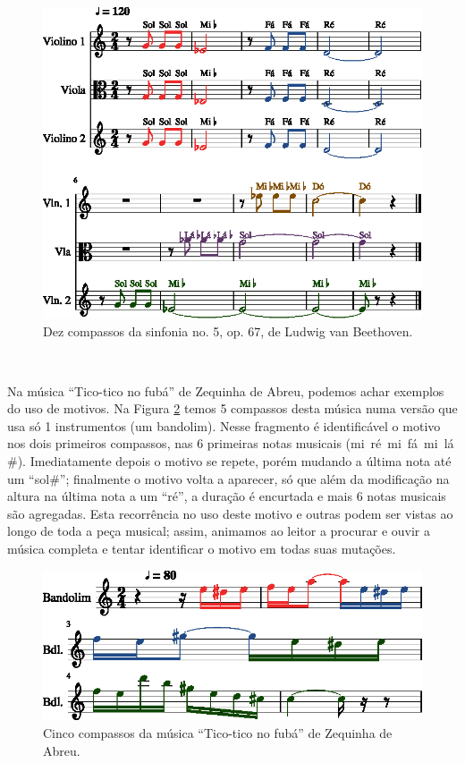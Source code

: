 \begin{figure}[!h]
  \centering
    \includegraphics[width=\workboxsize]{chapters/cap-musica-composer/Symphony5Op67-out-1.eps}
\caption{Dez compassos da sinfonia no. 5, op. 67, de Ludwig van Beethoven.}
\label{fig:10Symphony5Op67}
\end{figure}

~


\begin{example}
Na música ``Tico-tico no fubá'' de Zequinha de Abreu, podemos achar exemplos do uso de motivos. 
Na Figura \ref{fig:Tico-tico_no_fuba-1} temos 5 compassos desta música 
numa versão que usa só 1 instrumentos (um bandolim).
Nesse fragmento é identificável o motivo nos dois primeiros compassos, 
nas 6 primeiras notas musicais (mi~ré~mi~fá~mi~lá$\#$).
Imediatamente depois o motivo se repete, porém mudando a última nota até um ``sol$\#$'';
finalmente o motivo volta a aparecer, só que além da modificação na altura na última nota a um ``ré'',
a duração é encurtada e mais 6 notas musicais são agregadas.
Esta recorrência no uso deste motivo e outras podem ser vistas ao longo de toda a peça musical;
assim, animamos ao leitor a procurar e ouvir a música completa e tentar identificar o motivo em todas suas mutações. 
\end{example}

\begin{figure}[!h]
  \centering
    \includegraphics[width=\workboxsize]{chapters/cap-musica-composer/Tico-tico_no_fuba-1.eps}
\caption{Cinco compassos da música ``Tico-tico no fubá'' de Zequinha de Abreu.}
\label{fig:Tico-tico_no_fuba-1}
\end{figure}

~

